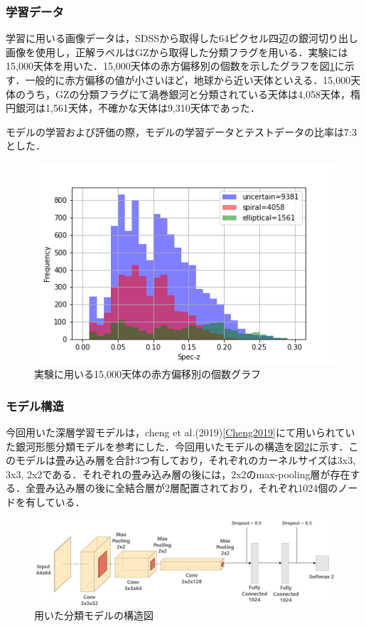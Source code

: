 \documentclass[a4j, 11pt]{jreport}
\begin{document}
\subsubsection{学習データ}
学習に用いる画像データは，SDSSから取得した64ピクセル四辺の銀河切り出し画像を使用し，正解ラベルはGZから取得した分類フラグを用いる．実験には15,000天体を用いた．15,000天体の赤方偏移別の個数を示したグラフを図\ref{fig:z_15000}に示す．一般的に赤方偏移の値が小さいほど，地球から近い天体といえる．15,000天体のうち，GZの分類フラグにて渦巻銀河と分類されている天体は4,058天体，楕円銀河は1,561天体，不確かな天体は9,310天体であった．

モデルの学習および評価の際，モデルの学習データとテストデータの比率は7:3とした．

\begin{figure}[h]
 \centering
 \includegraphics[width=14cm]{images/z_15000_4.png}
 \caption{実験に用いる15,000天体の赤方偏移別の個数グラフ}
 \label{fig:z_15000}
\end{figure}

\subsubsection{モデル構造}
今回用いた深層学習モデルは，cheng et al.(2019)\ref{Cheng2019}にて用いられていた銀河形態分類モデルを参考にした．今回用いたモデルの構造を図\ref{fig:model_shape}に示す．このモデルは畳み込み層を合計3つ有しており，それぞれのカーネルサイズは3x3, 3x3, 2x2である．それぞれの畳み込み層の後には，2x2のmax-pooling層が存在する．全畳み込み層の後に全結合層が2層配置されており，それぞれ1024個のノードを有している．

\begin{figure}[h]
	\centering
	\includegraphics[width=14cm]{images/model_shape.PNG}
	\caption{用いた分類モデルの構造図}
	\label{fig:model_shape}
\end{figure}
 
\end{document}
